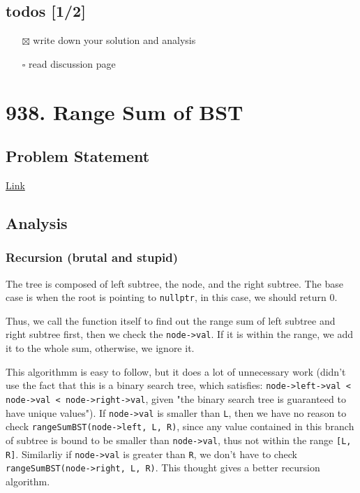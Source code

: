 \documentclass[12pt]{article}
\begin{document}
\subsection{todos [1/2]}
\label{sec:orge1d2420}
\begin{itemize}
\item[{$\boxtimes$}] write down your solution and analysis
\item[{$\square$}] read discussion page
\end{itemize}
\section{938. Range Sum of BST}
\label{sec:org165f067}
\subsection{Problem Statement}
\label{sec:org24af3e7}
\href{https://leetcode.com/problems/range-sum-of-bst/}{Link}
\subsection{Analysis}
\label{sec:orge152c3a}
\subsubsection{Recursion (brutal and stupid)}
\label{sec:orge188032}
The tree is composed of left subtree, the node, and the right subtree. The base case is when the root is pointing to \texttt{nullptr}, in this case, we should return 0.

Thus, we call the function itself to find out the range sum of left subtree and right subtree first, then we check the \texttt{node->val}. If it is within the range, we add it to the whole sum, otherwise, we ignore it.

This algorithmm is easy to follow, but it does a lot of unnecessary work (didn't use the fact that this is a binary search tree, which satisfies: \texttt{node->left->val < node->val < node->right->val}, given "the binary search tree is guaranteed to have unique values"). If \texttt{node->val} is smaller than \texttt{L}, then we have no reason to check \texttt{rangeSumBST(node->left, L, R)}, since any value contained in this branch of subtree is bound to be smaller than \texttt{node->val}, thus not within the range \texttt{[L, R]}. Similarliy if \texttt{node->val} is greater than \texttt{R}, we don't have to check \texttt{rangeSumBST(node->right, L, R)}. This thought gives a better recursion algorithm.
\end{document}
